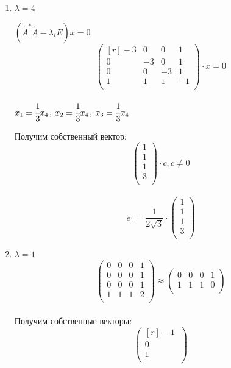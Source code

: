 \documentclass[12pt]{article}
\theoremstyle{definition}
\numberwithin{equation}{section}
\begin{document}
	\begin{enumerate}
		\item $\lambda = 4$\\
		\begin{center}
			$(\tilde{A}^*\tilde{A}-\lambda_iE)x=0$\\
			\[\begin{pmatrix}[r]
			-3 & 0 & 0 & 1\\         
			0 & -3 & 0 & 1\\
			0 & 0 & -3 & 1\\
			1 & 1 & 1 & -1\\
			\end{pmatrix}\cdot x = 0\]
			\\
			$x_1=\cfrac{1}{3}x_4$, 
			$x_2=\cfrac{1}{3}x_4$, 
			$x_3=\cfrac{1}{3}x_4$
		\end{center}
		Получим собственный вектор: \[\begin{pmatrix}
		1\\         
		1\\
		1\\
		3\\
		\end{pmatrix} \cdot c, c\neq 0\]
		\\
		\[e_1 = \frac{1}{2\sqrt{3}} \cdot \begin{pmatrix}
		1\\         
		1\\
		1\\
		3\\
		\end{pmatrix}\]
		\item $\lambda=1$\\
		\[\begin{pmatrix}
		0 & 0 & 0 & 1\\         
		0 & 0 & 0 & 1\\
		0 & 0 & 0 & 1\\
		1 & 1 & 1 & 2\\
		\end{pmatrix} \approx \begin{pmatrix}
		0 & 0 & 0 & 1\\         
		1 & 1 & 1 & 0\\
		\end{pmatrix}\]
		\\
		Получим собственные векторы: \[\begin{pmatrix}[r]
		-1~\\         
		0~\\
		1~\\

\end{pmatrix}\]
\end{enumerate}
\end{document}
